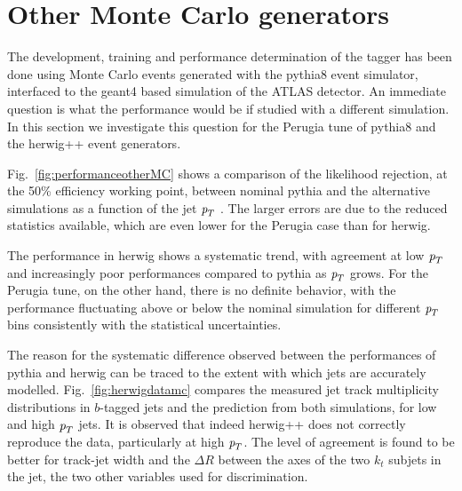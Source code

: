 \section{Other Monte Carlo generators}\label{sec:otherMC}

The development, training and performance determination of the tagger has been done using Monte Carlo events generated with the {\sc pythia8} event simulator, interfaced to the {\sc geant4} based simulation of the ATLAS detector. An immediate question is what the performance would be if studied with a different simulation. In this section we investigate this question for the Perugia tune of {\sc pythia8} and the {\sc herwig++} event generators.

Fig.~\ref{fig:performanceotherMC} shows a comparison of the likelihood rejection, at the 50\% efficiency working point,  between nominal {\sc pythia} and the alternative simulations %
as a function of the jet ${\emph{p}_{T}}$ . The larger errors are due to the reduced statistics available, which are even lower for the Perugia case than for {\sc herwig}.




The performance in {\sc herwig} shows a systematic trend, with agreement at low ${\emph{p}_{T}}$ and increasingly poor performances compared to {\sc pythia} as ${\emph{p}_{T}}$ grows. For the Perugia tune, on the other hand, there is no definite behavior, with the performance fluctuating above or below the nominal simulation for different ${\emph{p}_{T}}$ bins consistently with the statistical uncertainties.

The reason for the systematic difference observed between the performances of {\sc pythia} and {\sc herwig} can be traced to the extent with which jets are accurately modelled. Fig.~\ref{fig:herwigdatamc} compares the measured jet track multiplicity distributions in $b$-tagged jets and the prediction from both simulations, for low and high ${\emph{p}_{T}}$ jets. It is observed that indeed {\sc herwig++} does not correctly reproduce the data, particularly at high ${\emph{p}_{T}}$. The level of agreement is found to be better for track-jet width and the $\Delta R$ between the axes of the two $k_t$ subjets in the jet, the two other variables used for discrimination.



